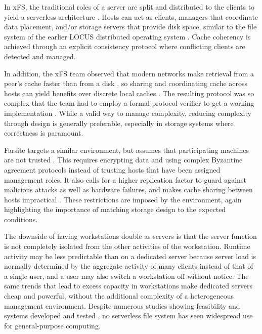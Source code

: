 In xFS, the traditional roles of a server are split and distributed to the clients to yield a serverless architecture \cite{wang93,anderson95b}. Hosts can act as clients, managers that coordinate data placement, and/or storage servers that provide disk space, similar to the file system of the earlier LOCUS distributed operating system \cite{walker}. Cache coherency is achieved through an explicit consistency protocol where conflicting clients are detected and managed.

In addition, the xFS team observed that modern networks make retrieval from a peer's cache faster than from a disk \cite{dahlin94b}, so sharing and coordinating cache across hosts can yield benefits over discrete local caches \cite{dahlin94a}. The resulting protocol was so complex that the team had to employ a formal protocol verifier to get a working implementation \cite{wang98}. While a valid way to manage complexity, reducing complexity through design is generally preferable, especially in storage systems where correctness is paramount.

Farsite targets a similar environment, but assumes that participating machines are not trusted \cite{adya}. This requires encrypting data and using complex Byzantine agreement protocols instead of trusting hosts that have been assigned management roles. It also calls for a higher replication factor to guard against malicious attacks as well as hardware failures, and makes cache sharing between hosts impractical \cite{dahlin94a}. These restrictions are imposed by the environment, again highlighting the importance of matching storage design to the expected conditions.

The downside of having workstations double as servers is that the server function is not completely isolated from the other activities of the workstation. Runtime activity may be less predictable than on a dedicated server because server load is normally determined by the aggregate activity of many clients instead of that of a single user, and a user may also switch a workstation off without notice. The same trends that lead to excess capacity in workstations make dedicated servers cheap and powerful, without the additional complexity of a heterogeneous management environment. Despite numerous studies \cite{bolosky,douceur99,douceur01} showing feasibility and systems developed and tested \cite{adya,walker}, no serverless file system has seen widespread use for general-purpose computing.

